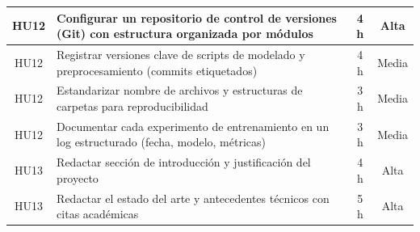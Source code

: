 \documentclass[
11pt, %
]{charter}
\begin{document}
\begin{table}[htpb]
\begin{tabularx}{\linewidth}{@{}|c|X|c|c|@{}}
HU12 & Configurar un repositorio de control de versiones (Git) con estructura organizada por módulos & 4 h & Alta \\ \hline
HU12 & Registrar versiones clave de scripts de modelado y preprocesamiento (commits etiquetados) & 4 h & Media \\ \hline
HU12 & Estandarizar nombre de archivos y estructuras de carpetas para reproducibilidad & 3 h & Media \\ \hline
HU12 & Documentar cada experimento de entrenamiento en un log estructurado (fecha, modelo, métricas) & 3 h & Media \\ \hline

HU13 & Redactar sección de introducción y justificación del proyecto & 4 h & Alta \\ \hline
HU13 & Redactar el estado del arte y antecedentes técnicos con citas académicas & 5 h & Alta \\ \hline


\end{tabularx}
\end{table}
\end{document}
